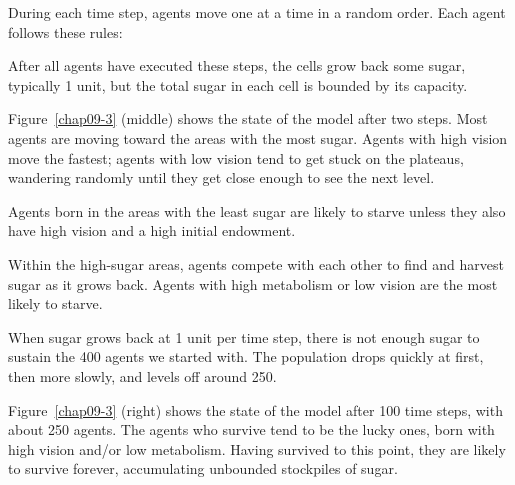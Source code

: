\documentclass[12pt]{book}
\theoremstyle{exercise}
\newcommand{\py}{\verb}%}
\begin{document}
During each time step, agents move one at a time in a random order.
Each agent follows these rules:


After all agents have executed these steps, the cells grow back
some sugar, typically 1 unit, but the total sugar in each cell is
bounded by its capacity.

Figure~\ref{chap09-3} (middle) shows the state of the model after two
steps.  Most agents are moving toward the areas with the most sugar.
Agents with high vision move the fastest; agents with low vision
tend to get stuck on the plateaus, wandering randomly until they get
close enough to see the next level.

Agents born in the areas with the least sugar are likely to starve
unless they also have high vision and a high initial endowment.

Within the high-sugar areas, agents compete with each other to
find and harvest sugar as it grows back.  Agents with high metabolism
or low vision are the most likely to starve.

When sugar grows back at 1 unit per time step, there is not enough
sugar to sustain the 400 agents we started with.  The population
drops quickly at first, then more slowly, and levels off around 250.

Figure~\ref{chap09-3} (right) shows the state of the model after 100
time steps, with about 250 agents.  The agents who survive tend to
be the lucky ones, born with high vision and/or low metabolism.
Having survived to this point, they are likely to survive forever,
accumulating unbounded stockpiles of sugar.
\end{document}
